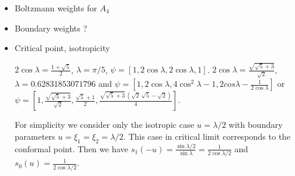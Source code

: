 \documentclass[12pt]{article}
\begin{document}
\begin{itemize}
\item Boltzmann weights for $A_{4}$
\item Boundary weights ?
\item Critical point, isotropicity

$2\cos\lambda=\frac{1+\sqrt{5}}{2}$, $\lambda=\pi/5$, $\psi=\left[1,2\cos\lambda,2\cos\lambda,1\right]$.
$2\cos\lambda=\frac{\sqrt{\sqrt{5}+3}}{\sqrt{2}}$,
$\lambda=0.62831853071796$ and $\psi=\left[1,2\cos\lambda,
  4\cos^2\lambda-1, 2cos\lambda-\frac{1}{2\cos\lambda}\right]$ or $\psi=\left[1,\frac{\sqrt{\sqrt{5}+3}}{\sqrt{2}},\frac{\sqrt{5}+1}{2},\frac{\sqrt{\sqrt{5}+3}\,\left( \sqrt{2}\,\sqrt{5}-\sqrt{2}\right) }{4}\right]$.

For simplicity we consider only the isotropic case $u=\lambda/2$ with boundary parameters
$u=\xi_1=\xi_2=\lambda/2$. This case in critical limit corresponds to the  conformal point. Then we have
$s_1(-u)=\frac{\sin\lambda/2}{\sin\lambda}=\frac{1}{2\cos\lambda/2}$ and $s_0(u)=\frac{1}{2\cos\lambda/2}$.


\end{itemize}
\end{document}
